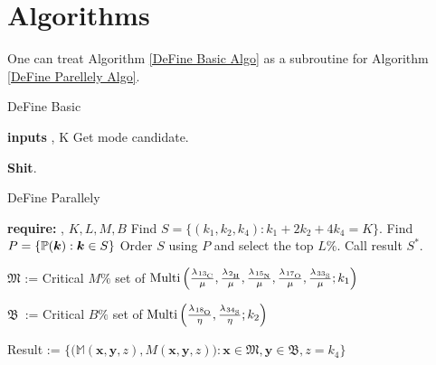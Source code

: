 \section{Algorithms}


One can treat Algorithm \ref{DeFine Basic Algo} as a subroutine for Algorithm \ref{DeFine Parellely Algo}.

\begin{algorithm}\caption{DeFine Basic}
\begin{algorithmic}[1]\label{DeFine Basic Algo}

	\State 	\textbf{inputs}	\smallMolecule, K 
	\State 	Get mode candidate.
	
	\State  \textbf{Shit}.
\end{algorithmic}	
\end{algorithm}


\begin{algorithm}\caption{DeFine Parallely}
\begin{algorithmic}[1]\label{DeFine Parellely Algo}
	\State	\textbf{require:} \molecule, $K, L, M, B$
	\State 	Find  		$S = \{ (k_1, k_2, k_4) : k_1 + 2 k_2 + 4 k_4 = K \}$.
	\State 	Find 		$P = \{ \mathbb{P}(\bm{k}) : \bm{k} \in S \}$
	\State 	Order $S$ using $P$ and select the top $L \%$. Call result $S^*$.
	

		\State $\mathfrak{M}$ := Critical $M\%$ set of $\mathrm{Multi} \left(
				\frac{ \lambda_\cem{^{13}C} }{ \mu }, 
				\frac{ \lambda_\cem{^{2} H} }{ \mu }, 
				\frac{ \lambda_\cem{^{15}N} }{ \mu },
				\frac{ \lambda_\cem{^{17}O} }{ \mu }, 
				\frac{ \lambda_\cem{^{33}S} }{ \mu }; 
				k_1
			\right )$

		\State $\mathfrak{B}$ \,:= Critical $B\%$ set of 
		$\mathrm{Multi} \left(
			\frac{ \lambda_\cem{^{18}O} }{ \eta },
			\frac{ \lambda_\cem{^{34}S} }{ \eta }; 
			k_2	
		\right)$		


		\State 	Result := 
			$\Bigg\{ 
				\Big( 
					\mathbb{M}( \bm{x}, \bm{y}, z ), 
					M( \bm{x}, \bm{y}, z )
				\Big) : 
				\bm{x} \in \mathfrak{M}, 
				\bm{y} \in \mathfrak{B}, 
				z = k_4  
			\Bigg\}$
	\ENDFAP

\end{algorithmic}	
\end{algorithm}